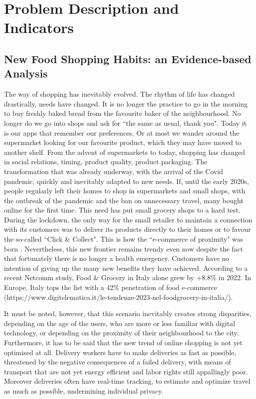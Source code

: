 \section{Problem Description and Indicators}
\subsection{New Food Shopping Habits: an Evidence-based Analysis}

The way of shopping has inevitably evolved. The rhythm of life has changed drastically, needs have changed. It is no longer the practice to go in the morning to buy freshly baked bread from the favourite baker of the neighbourhood. No longer do we go into shops and ask for ``the same as usual, thank you". Today it is our apps that remember our preferences. Or at most we wander around the supermarket looking for our favourite product, which they may have moved to another shelf. From the advent of supermarkets to today, shopping has changed in social relations, timing, product quality, product packaging. The transformation that was already underway, with the arrival of the Covid pandemic, quickly and inevitably adapted to new needs. If, until the early 2020s, people regularly left their homes to shop in supermarkets and small shops, with the outbreak of the pandemic and the ban on unnecessary travel, many bought online for the first time. This need has put small grocery shops to a hard test. During the lockdown, the only way for the small retailer to maintain a connection with its customers was to deliver its products directly to their homes or to favour the so-called ``Click \& Collect". This is how the ``e-commerce of proximity" was born \cite{prox_ecom}. Nevertheless, this new frontier remains trendy even now despite the fact that fortunately there is no longer a health emergency. Customers have no intention of giving up the many new benefits they have achieved. According to a recent Netcomm study, Food \& Grocery in Italy alone grew by +8.8\% in 2022. In Europe, Italy tops the list with a 42\% penetration of food e-commerce (https://www.digitelematica.it/le-tendenze-2023-nel-foodgrocery-in-italia/). 

It must be noted, however, that this scenario inevitably creates strong disparities, depending on the age of the users, who are more or less familiar with digital technology, or depending on the proximity of their neighbourhood to the city.
Furthermore, it has to be said that the new trend of online shopping is not yet optimised at all. Delivery workers have to make deliveries as fast as possible, threatened by the negative consequences of a failed delivery, with means of transport that are not yet energy efficient and labor rights still appallingly poor. Moreover deliveries often have real-time tracking, to estimate and optimize travel as much as possible, undermining individual privacy.

